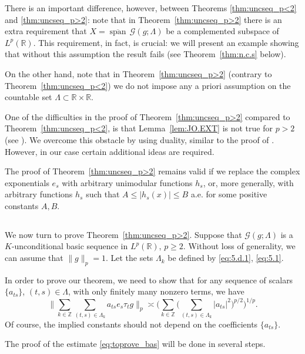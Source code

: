 \documentclass[reqno,a4paper,12pt]{amsart}
\numberwithin{equation}{section}
\numberwithin{figure}{section}
\newcommand\R{\mathbb{R}}
\newcommand\Z{\mathbb{Z}}
\newcommand\G{\mathcal{G}}
\newcommand\Lam{\Lambda}
\newcommand\1{\mathds{1}}
\newcommand{\ts}{\tau}
\renewcommand\le{\leqslant}
\renewcommand\ge{\geqslant}
\newcommand\sbt{\subset}
\newcommand{\cspan}{\overline{\operatorname{span}}}
\theoremstyle{plain}
\newcommand{\thmref}[1]{Theorem~\ref{#1}}
\newcommand{\lemref}[1]{Lemma~\ref{#1}}
\theoremstyle{definition}
\begin{document}
There is an important difference, however, between Theorems \ref{thm:uncseq_p<2} and \ref{thm:uncseq_p>2}: note that in \thmref{thm:uncseq_p>2} there is an extra requirement that $X = \cspan \, \G(g; \Lambda)$ be a complemented subspace of $L^p(\R)$. This requirement, in fact, is crucial: we will present an example showing that without this assumption the result fails
(see \thmref{thm:n.c.s} below).

On the other hand, note that in \thmref{thm:uncseq_p>2} (contrary to 
\thmref{thm:uncseq_p<2}) we do not impose any
a priori assumption on the countable set
$\Lam \sbt \R \times \R$.


One of the difficulties in the proof of \thmref{thm:uncseq_p>2}
compared to \thmref{thm:uncseq_p<2},  is that \lemref{lem:JO.EXT} is not true for $p > 2$
(see \cite[Example 2.16]{OSSZ11}). We overcome this obstacle by using duality, similar to the proof of \cite[Theorem 2.1]{FOSZ14}. However, in our case certain additional ideas are required.

The proof of \thmref{thm:uncseq_p>2} remains valid if we replace the complex exponentials $e_s$ with arbitrary unimodular functions $h_s$, or, more generally, with arbitrary functions $h_s$ such that $A \le |h_s(x)| \le B$ a.e. for some positive constants $A,B$.




\subsection{}
We now turn to prove \thmref{thm:uncseq_p>2}. Suppose that $\G(g; \Lambda)$ is a $K$-unconditional basic sequence in $L^p(\R)$, $p \ge 2$. Without loss of generality, we can assume that $\|g\|_p = 1$. Let the sets $\Lambda_k$ be defined by \eqref{eq:5.d.1}, \eqref{eq:5.1}. 

In order to prove our theorem, we need to show
that for any sequence of scalars $\{a_{ts}\}$, $(t,s)\in \Lambda$, 
with only finitely many nonzero terms, we have
\begin{equation}
\label{eq:toprove_bas}
\Big\| \sum_{k\in\Z} \sum_{(t,s)\in\Lambda_k} a_{ts} e_s \ts_t g \Big\|_p \asymp \Big(\sum_{k\in\Z}\Big( \sum_{(t,s)\in\Lambda_k}|a_{ts}|^2 \Big)^{p/2} \Big)^{1/p}.
\end{equation}
Of course, the implied constants should not depend on the coefficients $\{a_{ts}\}$.

The proof of the estimate \eqref{eq:toprove_bas} will be done in several steps. 
\end{document}
